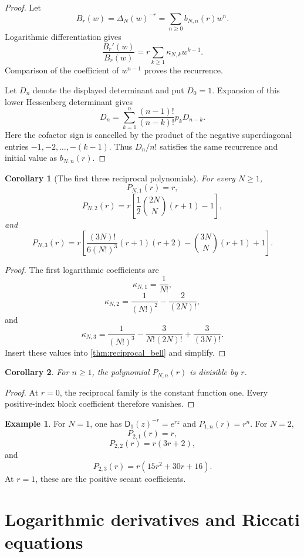 \documentclass[11pt]{article}
\newtheorem{corollary}[corollary]{Corollary}
\theoremstyle{definition}
\newtheorem{example}[example]{Example}
\theoremstyle{remark}
\newcommand{\Dfun}{\mathsf D}
\begin{document}
\begin{proof}
Let
\[
B_r(w)=\Delta_N(w)^{-r}
=
\sum_{n\geq0}b_{N,n}(r)w^n.
\]
Logarithmic differentiation gives
\[
\frac{B_r'(w)}{B_r(w)}
=
r\sum_{k\geq1}\kappa_{N,k}w^{k-1}.
\]
Comparison of the coefficient of $w^{n-1}$ proves the recurrence.

Let $D_n$ denote the displayed determinant and put $D_0=1$.  Expansion of this lower Hessenberg determinant gives
\[
D_n
=
\sum_{k=1}^{n}
\frac{(n-1)!}{(n-k)!}p_kD_{n-k}.
\]
Here the cofactor sign is cancelled by the product of the negative
superdiagonal entries $-1,-2,\ldots,-(k-1)$.
Thus $D_n/n!$ satisfies the same recurrence and initial value as $b_{N,n}(r)$.
\end{proof}

\begin{corollary}[The first three reciprocal polynomials]\label{cor:first_reciprocal_polynomials}
For every $N\geq1$,
\[
P_{N,1}(r)=r,
\]
\[
P_{N,2}(r)
=
r\left[
\frac12\binom{2N}{N}(r+1)-1
\right],
\]
and
\[
P_{N,3}(r)
=
r\left[
\frac{(3N)!}{6(N!)^3}(r+1)(r+2)
-
\binom{3N}{N}(r+1)
+1
\right].
\]
\end{corollary}

\begin{proof}
The first logarithmic coefficients are
\[
\kappa_{N,1}=\frac1{N!},
\]
\[
\kappa_{N,2}=\frac1{(N!)^2}-\frac2{(2N)!},
\]
and
\[
\kappa_{N,3}
=
\frac1{(N!)^3}
-
\frac3{N!(2N)!}
+
\frac3{(3N)!}.
\]
Insert these values into \cref{thm:reciprocal_bell} and simplify.
\end{proof}

\begin{corollary}\label{cor:factor_r}
For $n\geq1$, the polynomial $P_{N,n}(r)$ is divisible by $r$.
\end{corollary}

\begin{proof}
At $r=0$, the reciprocal family is the constant function one.  Every positive-index block coefficient therefore vanishes.
\end{proof}

\begin{example}\label{ex:reciprocal_polynomials}
For $N=1$, one has $\Dfun_1(z)^{-r}=e^{rz}$ and $P_{1,n}(r)=r^n$.  For $N=2$,
\[
P_{2,1}(r)=r,
\]
\[
P_{2,2}(r)=r(3r+2),
\]
and
\[
P_{2,3}(r)=r(15r^2+30r+16).
\]
At $r=1$, these are the positive secant coefficients.
\end{example}

\section{Logarithmic derivatives and Riccati equations}\label{sec:tangent}
\end{document}
